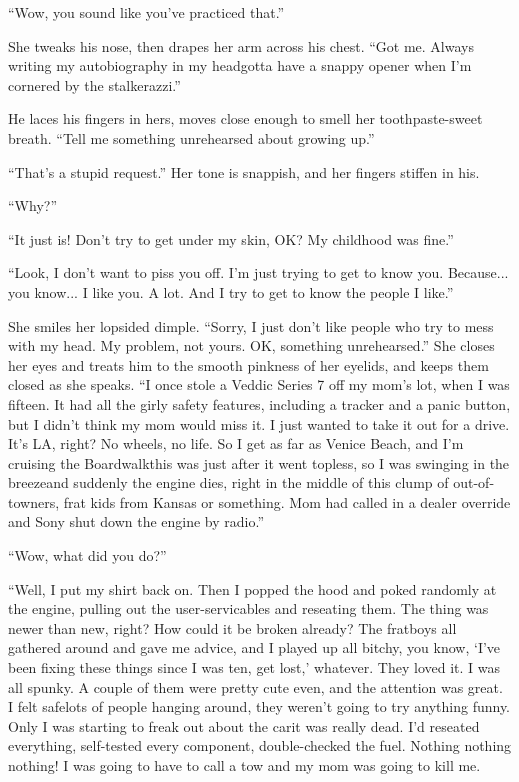 “Wow, you sound like you’ve practiced that.”

She tweaks his nose, then drapes her arm across his chest. “Got me.
Always writing my autobiography in my head{\dash}gotta have a snappy
open\-er when I’m cornered by the stalkerazzi.”

He laces his fingers in hers, moves close enough to smell her
tooth\-paste-sweet breath. “Tell me something unrehearsed about
growing up.”

“That’s a stupid request.” Her tone is snappish, and her fingers
stiffen in his.

“Why?”

“It just is! Don’t try to get under my skin, OK? My childhood was
fine.”

“Look, I don’t want to piss you off. I’m just trying to get to know
you. Because... you know... I like you. A lot. And I try to get to
know the people I like.”

She smiles her lopsided dimple. “Sorry, I just don’t like people
who try to mess with my head. My problem, not yours. OK, something
unrehearsed.” She closes her eyes and treats him to the smooth
pinkness of her eyelids, and keeps them closed as she speaks. “I
once stole a Veddic Series 7 off my mom’s lot, when I was fifteen.
It had all the girly safety features, including a tracker and a
panic button, but I didn’t think my mom would miss it. I just
wanted to take it out for a drive. It’s LA, right? No wheels, no
life. So I get as far as Venice Beach, and I’m cruising the
Boardwalk{\dash}this was just after it went topless, so I was swinging in
the breeze{\dash}and suddenly the engine dies, right in the middle of
this clump of out-of-towners, frat kids from Kansas or something.
Mom had called in a dealer override and Sony shut down the engine
by radio.”

“Wow, what did you do?”

“Well, I put my shirt back on. Then I popped the hood and poked
randomly at the engine, pulling out the user-servicables and
reseating them. The thing was newer than new, right? How could it
be broken already? The fratboys all gathered around and gave me
advice, and I played up all bitchy, you know, ‘I’ve been fixing
these things since I was ten, get lost,’ whatever. They loved it. I
was all spunky. A couple of them were pretty cute even, and the
attention was great. I felt safe{\dash}lots of people hanging around,
they weren’t going to try anything funny. Only I was starting to
freak out about the car{\dash}it was really dead. I’d reseated
everything, self-tested every component, double-checked the fuel.
Nothing nothing nothing! I was going to have to call a tow and my
mom was going to kill me.

